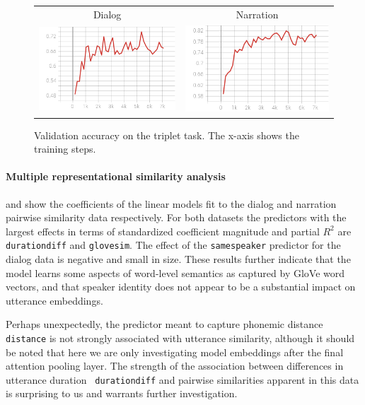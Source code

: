 \begin{figure}
  \centering
  \begin{tabular}{cc}
    Dialog & Narration \\
    \includegraphics[scale=0.3]{val_acc3.png}  & \includegraphics[scale=0.3]{valnarr_acc3.png}\\
  \end{tabular}
  \caption{Validation accuracy on the triplet task. The x-axis shows
    the training steps.}
  \label{fig:triplet}
\end{figure}

\paragraph{Multiple representational similarity analysis}
 and  show the coefficients
of the linear models fit to the dialog and narration pairwise
similarity data respectively. For both datasets the predictors with
the largest effects in terms of standardized coefficient magnitude and
partial $R^2$ are {\tt durationdiff} and {\tt glovesim}. The effect of
the {\tt samespeaker} predictor for the dialog data is negative and
small in size.  These results further indicate that the model learns
some aspects of word-level semantics as captured by GloVe word
vectors, and that speaker identity does not appear to be a substantial
impact on utterance embeddings.

Perhaps unexpectedly, the predictor meant to capture phonemic distance
{\tt distance} is not strongly associated with utterance similarity,
although it should be noted that here we are only investigating model
embeddings after the final attention pooling layer. The strength of
the association between differences in utterance duration {\tt
  durationdiff} and pairwise similarities apparent in this data is
surprising to us and warrants further investigation.

